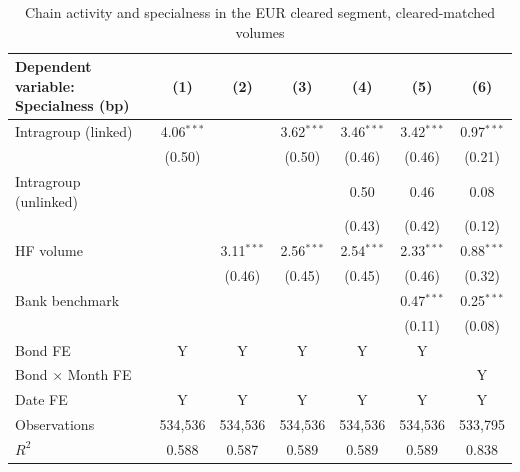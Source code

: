 \documentclass[english, 11pt, oneside, legal]{article}
\begin{document}
\begin{table}[htbp]
    \centering
    \caption{Chain activity and specialness in the EUR cleared segment, cleared-matched volumes}
    \label{tab:specialness}
    \begin{tabular}{lcccccc}
        \hline
        Dependent variable: Specialness (bp) & (1) & (2) & (3) & (4) & (5) & (6) \\
        \hline
        Intragroup (linked)    & 4.06$^{***}$ &              & 3.62$^{***}$ & 3.46$^{***}$ & 3.42$^{***}$ & 0.97$^{***}$ \\
                               & (0.50)       &              & (0.50)       & (0.46)       & (0.46)       & (0.21)       \\
        Intragroup (unlinked)  &              &              &              & 0.50         & 0.46         & 0.08         \\
                               &              &              &              & (0.43)       & (0.42)       & (0.12)       \\
        HF volume              &              & 3.11$^{***}$ & 2.56$^{***}$ & 2.54$^{***}$ & 2.33$^{***}$ & 0.88$^{***}$ \\
                               &              & (0.46)       & (0.45)       & (0.45)       & (0.46)       & (0.32)       \\
        Bank benchmark         &              &              &              &              & 0.47$^{***}$ & 0.25$^{***}$ \\
                               &              &              &              &              & (0.11)       & (0.08)       \\
        \hline
        Bond FE                & Y            & Y            & Y            & Y            & Y            &              \\
        Bond $\times$ Month FE &              &              &              &              &              & Y            \\
        Date FE                & Y            & Y            & Y            & Y            & Y            & Y            \\
        Observations           & 534{,}536    & 534{,}536    & 534{,}536    & 534{,}536    & 534{,}536    & 533{,}795    \\
        $R^{2}$                & 0.588        & 0.587        & 0.589        & 0.589        & 0.589        & 0.838        \\
        \hline
    \end{tabular}

\end{table}
\end{document}
